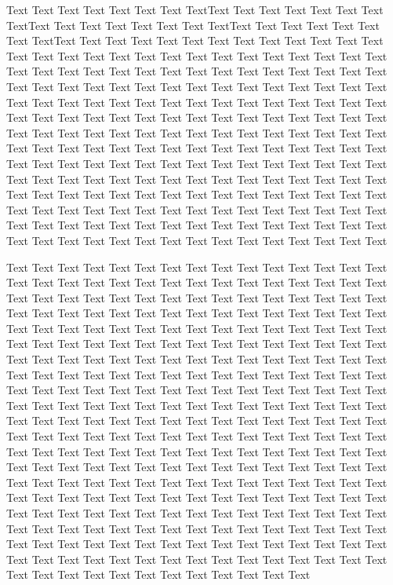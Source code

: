 \documentclass[letter]{bioinfo}
\begin{document}
%
Text Text Text Text Text Text  Text TextText Text Text Text Text Text  Text TextText Text Text Text Text Text  Text TextText Text Text Text Text Text  Text TextText Text Text Text Text Text  Text Text Text Text Text Text Text Text  Text Text Text Text Text Text Text Text  Text Text Text Text Text Text Text Text  Text Text Text Text Text Text Text Text  Text Text Text Text Text Text Text Text  Text Text Text Text Text Text Text Text  Text Text Text Text Text Text Text Text  Text Text Text Text Text Text Text Text  Text Text Text Text Text Text Text Text  Text Text Text Text Text Text Text Text  Text Text Text Text Text Text Text Text  Text Text Text Text Text Text Text Text  Text Text Text Text Text Text Text Text  Text Text Text Text Text Text Text Text  Text Text Text Text Text Text Text Text  Text Text Text Text Text Text Text Text  Text Text Text Text Text Text Text Text  Text Text Text Text Text Text Text Text  Text Text Text Text Text Text Text Text  Text Text Text Text Text Text Text Text  Text Text Text Text Text Text Text Text  Text Text Text Text Text Text Text Text  Text Text Text Text Text Text Text Text  Text Text Text Text Text Text Text Text  Text Text Text Text Text Text Text Text  Text Text 

Text Text Text Text Text Text  Text Text Text Text Text Text Text Text  Text Text Text Text Text Text Text Text  Text Text Text Text Text Text Text Text  Text Text Text Text Text Text Text Text  Text Text Text Text Text Text Text Text  Text Text Text Text Text Text Text Text  Text Text Text Text Text Text Text Text  Text Text Text Text Text Text Text Text  Text Text Text Text Text Text Text Text  Text Text Text Text Text Text Text Text  Text Text Text Text Text Text Text Text  Text Text Text Text Text Text Text Text  Text Text Text Text Text Text Text Text  Text Text Text Text Text Text Text Text  Text Text Text Text Text Text Text Text  Text Text Text Text Text Text Text Text  Text Text Text Text Text Text Text Text  Text Text Text Text Text Text Text Text  Text Text Text Text Text Text Text Text  Text Text Text Text Text Text Text Text  Text Text Text Text Text Text Text Text  Text Text Text Text Text Text Text Text  Text Text Text Text Text Text Text Text  Text Text Text Text Text Text Text Text  Text Text Text Text Text Text Text Text  Text Text Text Text Text Text Text Text  Text Text Text Text Text Text Text Text  Text Text Text Text Text Text Text Text  Text Text Text Text Text Text Text Text  Text Text Text Text Text Text Text Text  Text Text Text Text Text Text Text Text  Text Text Text Text Text Text Text Text  Text Text Text Text Text Text Text Text  Text Text Text Text Text Text Text Text  Text Text Text Text Text Text Text Text  Text Text Text Text Text Text Text Text  Text Text Text Text Text Text Text Text  Text Text Text Text Text Text Text Text  Text Text  
\end{document}
